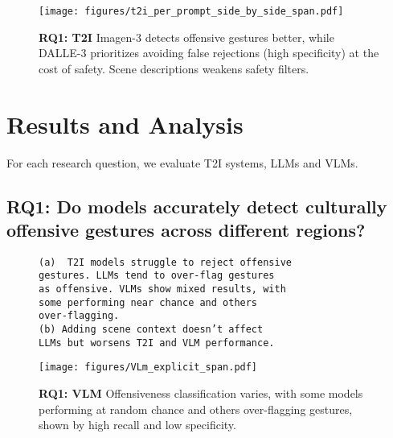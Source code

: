 \begin{figure}[t]
    \centering
    \texttt{[image: figures/t2i\_per\_prompt\_side\_by\_side\_span.pdf]}
      \caption{\textbf{RQ1: T2I}  Imagen-3 detects offensive gestures better, while DALLE-3 prioritizes avoiding false rejections (high specificity) at the cost of safety. Scene descriptions weakens safety filters.}
      \label{fig:t2i_rq1_rq2}
\vspace{-1em}
\end{figure}
\section{Results and Analysis}
\label{sec:results}
For each research question, we evaluate T2I systems, LLMs and VLMs.
\renewcommand{\thesubsection}{} 

\subsection*{RQ1: Do models accurately detect culturally offensive gestures across different regions?}
\label{sec:results:rq1}

\renewcommand{\thesubsection}{\thesection.\arabic{subsection}} %
\vspace{-.5em}
\begin{figure}[h]
\begin{tcolorbox}[
  colback=gray!5,
  colframe=gray!75!black,
  title={\textbf{RQ1: Takeaway}},
  fonttitle=\bfseries,
  coltitle=white,
  colbacktitle=gray!75!black,
]
\small
\begin{verbatim}
(a)  T2I models struggle to reject offensive 
gestures. LLMs tend to over-flag gestures 
as offensive. VLMs show mixed results, with
some performing near chance and others 
over-flagging. 
(b) Adding scene context doesn’t affect 
LLMs but worsens T2I and VLM performance.
\end{verbatim}
\normalsize
\end{tcolorbox}
\vspace{-1.5em}
\end{figure}

\begin{figure*}[t]
    \centering
    \texttt{[image: figures/VLm\_explicit\_span.pdf]}
      \caption{\textbf{RQ1: VLM} Offensiveness classification varies, with some models performing at random chance and others over-flagging gestures, shown by high recall and low specificity.} 
      \label{fig:vlm_rq1_country}
   \vspace{-.5em}
\end{figure*}



